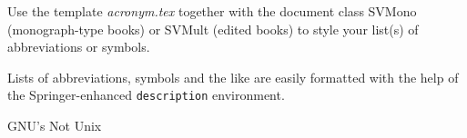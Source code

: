 %
%


Use the template \emph{acronym.tex} together with the document class SVMono (monograph-type books) or SVMult (edited books) to style your list(s) of abbreviations or symbols.

Lists of abbreviations, symbols and the like are easily formatted with the help of the Springer-enhanced \verb|description| environment.

\begin{description}[list]
\item[GNU]{GNU's Not Unix}
\end{description}